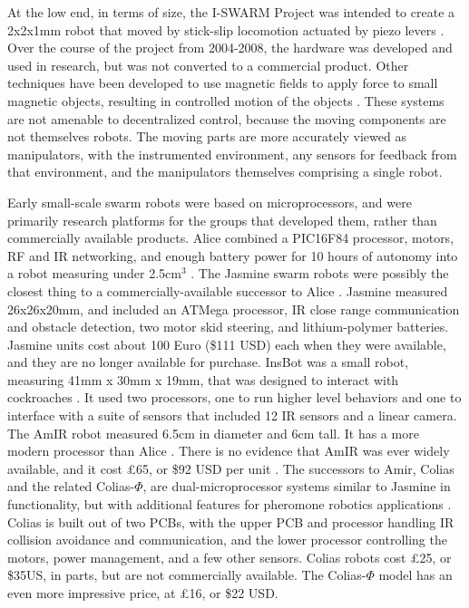 At the low end, in terms of size, the I-SWARM Project was intended to create a 2x2x1mm robot that moved by stick-slip locomotion actuated by piezo levers \citep{seyfried2005swarm}. 
Over the course of the project from 2004-2008, the hardware was developed and used in research, but was not converted to a commercial product.
Other techniques have been developed to use magnetic fields to apply force to small magnetic objects, resulting in controlled motion of the objects \citep{floyd2008untethered, pelrine2012diamagnetically}.
These systems are not amenable to decentralized control, because the moving components are not themselves robots. 
The moving parts are more accurately viewed as manipulators, with the instrumented environment, any sensors for feedback from that environment, and the manipulators themselves comprising a single robot. 

Early small-scale swarm robots were based on microprocessors, and were primarily research platforms for the groups that developed them, rather than commercially available products.
Alice combined a PIC16F84 processor, motors, RF and IR networking, and enough battery power for 10 hours of autonomy into a robot measuring under 2.5cm$^3$ \citep{caprari1998autonomous}. 
The Jasmine swarm robots were possibly the closest thing to a commercially-available successor to Alice \citep{kernbach2011swarmrobot}.
Jasmine measured 26x26x20mm, and included an ATMega processor, IR close range communication and obstacle detection, two motor skid steering, and lithium-polymer batteries.
Jasmine units cost about 100 Euro (\$111 USD) each when they were available, and they are no longer available for purchase. 
InsBot was a small robot, measuring 41mm x 30mm x 19mm, that was designed to interact with cockroaches \citep{colot2004insbot}.
It used two processors, one to run higher level behaviors and one to interface with a suite of sensors that included 12 IR sensors and a linear camera. 
The AmIR robot measured 6.5cm in diameter and 6cm tall. It has a more modern processor than Alice \citep{arvin2009development}.
There is no evidence that AmIR was ever widely available, and it cost \pounds65, or \$92 USD per unit \citep{arvin2015colias}.
The successors to Amir, Colias and the related Colias-$\Phi$, are dual-microprocessor systems similar to Jasmine in functionality, but with additional features for pheromone robotics applications \citep{arvin2014colias, arvin2015colias}. 
Colias is built out of two PCBs, with the upper PCB and processor handling IR collision avoidance and communication, and the lower processor controlling the motors, power management, and a few other sensors.
Colias robots cost \pounds25, or \$35US, in parts, but are not commercially available. 
The Colias-$\Phi$ model has an even more impressive price, at \pounds16, or \$22 USD.


